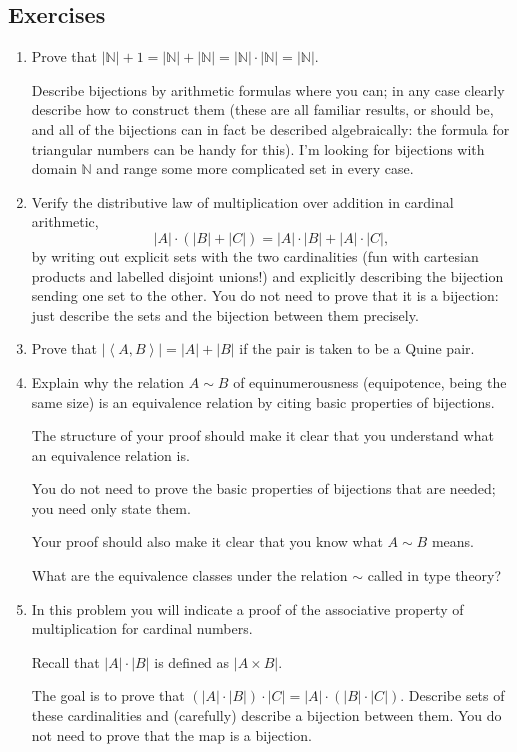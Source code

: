 \documentclass[12pt]{book}
\begin{document}
\subsection{Exercises}
\begin{enumerate}
\item
Prove that $|{\mathbb N}|+1 = |{\mathbb N}|+|{\mathbb N}| = |{\mathbb
N}|\cdot|{\mathbb N}| = |{\mathbb N}|$.

Describe bijections by arithmetic formulas where you can; in any case
clearly describe how to construct them (these are all familiar
results, or should be, and all of the bijections can in fact be
described algebraically: the formula for triangular numbers can be
handy for this).  I'm looking for bijections with domain ${\mathbb N}$
and range some more complicated set in every case.
\item
Verify the distributive law of multiplication over addition in
cardinal arithmetic, $$|A|\cdot(|B| +|C|) = |A|\cdot|B| +
|A|\cdot|C|,$$ by writing out explicit sets with the two cardinalities
(fun with cartesian products and labelled disjoint unions!) and
explicitly describing the bijection sending one set to the other.  You
do not need to prove that it is a bijection: just describe the sets
and the bijection between them precisely.
\item Prove that $|\left<A,B\right>| = |A|+|B|$ if the pair is taken
to be a Quine pair.

\item
Explain why the relation $A \sim B$ of equinumerousness (equipotence,
being the same size) is an equivalence relation by citing basic
properties of bijections.

The
structure of your proof should make it clear that you understand what
an equivalence relation is. 

You do not need to prove the basic
properties of bijections that are needed; you need only state them.

Your proof should also make it clear that you know what $A \sim B$
means.

What are the equivalence classes under the relation $\sim$ called in
type theory?
\item
In this problem you will indicate a proof of the associative property
of multiplication for cardinal numbers.  

Recall that $|A|\cdot|B|$ is defined as $|A \times B|$.

The goal is to prove that $(|A|\cdot|B|)\cdot|C| =
|A|\cdot(|B|\cdot|C|)$.  Describe sets of these cardinalities and
(carefully) describe a bijection between them.  You do not need to
prove that the map is a bijection.


\end{enumerate}
\end{document}
